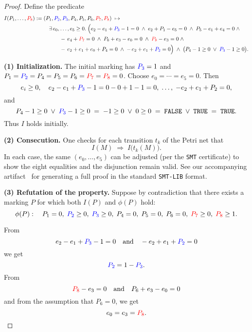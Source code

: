 \begin{proof}
	
	Define the predicate
	\[
	\begin{aligned}
		I(P_{1},\dots,\textcolor{red}{P_{8}})
		:={}&
		(P_{1},\textcolor{blue}{P_{2}},\textcolor{blue}{P_{3}},P_{4},P_{5},P_{6},\textcolor{red}{P_{7}},\textcolor{red}{P_{8}})
		\;\mapsto\;\\
		&\quad
		\exists\,e_{0},\dots,e_{5}\ge0.\;
		\Bigl(
		e_{2}-e_{1}+\textcolor{blue}{P_{3}}-1=0\;\land\;
		e_{2}+P_{1}-e_{5}=0\;\land\;
		P_{5}-e_{1}+e_{4}=0\;\land\\
		&\qquad\quad
		-\,e_{4}+\textcolor{red}{P_{7}}=0\;\land\;
		P_{6}+e_{3}-e_{0}=0\;\land\;
		\textcolor{red}{P_{8}}-e_{3}=0\;\land\\
		&\qquad\quad
		-\,e_{2}+e_{1}+e_{0}+P_{4}=0\;\land\;
		-\,e_{2}+e_{1}+\textcolor{blue}{P_{2}}=0
		\Bigr)
		\;\land\;
		\bigl(P_{4}-1\ge0\;\lor\;\textcolor{blue}{P_{3}}-1\ge0\bigr).
	\end{aligned}
	\]
	
	
	\medskip\noindent
	\textbf{(1) Initialization.}
	The initial marking has $\textcolor{blue}{P_{3}}=1$ and $P_{1}=\textcolor{blue}{P_{2}}=P_{4}=P_{5}=P_{6}=\textcolor{red}{P_{7}}=\textcolor{red}{P_{8}}=0$.
	Choose $e_{0}=\cdots=e_{5}=0$.  Then
	\[
	e_{i}\ge0,\quad
	e_{2}-e_{1}+\textcolor{blue}{P_{3}}-1=0-0+1-1=0,\;\dots,\;-e_{2}+e_{1}+P_{2}=0,
	\]
	and 
	\[
	P_{4}-1\ge0\;\lor\;\textcolor{blue}{P_{3}}-1\ge0
	\;=\;-1\ge0\;\lor\;0\ge0
	\;=\;\texttt{FALSE}\;\lor\;\texttt{TRUE}
	\;=\;\texttt{TRUE}.
	\]
	Thus $I$ holds initially.
	
	\medskip\noindent
	\textbf{(2) Consecution.}
	One checks for each transition $t_{k}$ of the Petri net that
	\[
	I(M)\;\Longrightarrow\;I\bigl(t_{k}(M)\bigr).
	\]
	In each case, the same $(e_{0},\dots,e_{5})$ can be adjusted (per the \texttt{SMT} certificate) to show the eight equalities and the disjunction remain valid. See our accompanying artifact~\cite{ArtifactRepository} for generating a full proof in the standard \texttt{SMT-LIB} format.
	
	\medskip\noindent
	\textbf{(3) Refutation of the property.}
	Suppose by contradiction that there exists a marking $P$ for which both $I(P)$ and $\phi(P)$ hold:
	\[
	\phi(P):\quad
	P_{1}=0,\;
	\textcolor{blue}{P_{2}}\ge0,\;
	\textcolor{blue}{P_{3}}\ge0,\;
	P_{4}=0,\;
	P_{5}=0,\;
	P_{6}=0,\;
	\textcolor{red}{P_{7}}\ge0,\;
	\textcolor{red}{P_{8}}\ge1.
	\] 
	
	\noindent
	From
	\[
	e_{2}-e_{1}+\textcolor{blue}{P_{3}}-1=0
	\quad\text{and}\quad
	-e_{2}+e_{1}+\textcolor{blue}{P_{2}}=0
	\]
	we get
	\[
	\textcolor{blue}{P_{2}}=1-\textcolor{blue}{P_{3}}.
	\]
	From
	\[
	\textcolor{red}{P_{8}}-e_{3}=0
	\quad\text{and}\quad
	P_{6}+e_{3}-e_{0}=0
	\]
	and from the assumption that $P_6=0$, we get
	\[
	e_{0}=e_{3}=\textcolor{red}{P_{8}}.
	\]
	

\end{proof}
